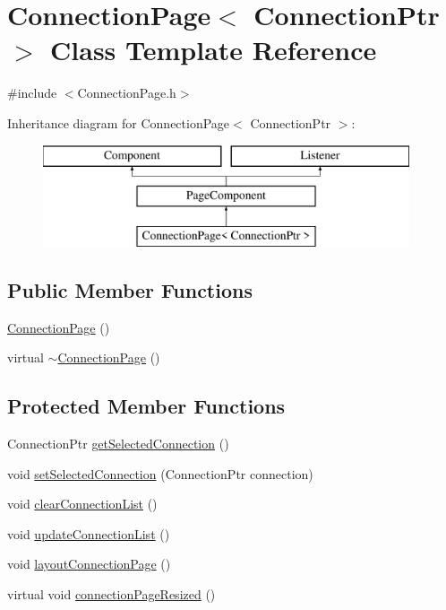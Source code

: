 \hypertarget{classConnectionPage}{}\section{Connection\+Page$<$ Connection\+Ptr $>$ Class Template Reference}
\label{classConnectionPage}


{\ttfamily \#include $<$Connection\+Page.\+h$>$}

Inheritance diagram for Connection\+Page$<$ Connection\+Ptr $>$\+:\begin{figure}[H]
\begin{center}
\leavevmode
\includegraphics[height=3.000000cm]{classConnectionPage}
\end{center}
\end{figure}
\subsection*{Public Member Functions}
\begin{DoxyCompactItemize}
\item 
\mbox{\hyperlink{classConnectionPage_aa23481432cf05cb07269ec54ea317972}{Connection\+Page}} ()
\item 
virtual \mbox{\hyperlink{classConnectionPage_aac26ceb81eee9366599d251d375bbbbf}{$\sim$\+Connection\+Page}} ()
\end{DoxyCompactItemize}
\subsection*{Protected Member Functions}
\begin{DoxyCompactItemize}
\item 
Connection\+Ptr \mbox{\hyperlink{classConnectionPage_a2ca9921ccbb7a4306fa4d77ebf5a0759}{get\+Selected\+Connection}} ()
\item 
void \mbox{\hyperlink{classConnectionPage_a672ee3a78cd42ba94b7e687691dfaffe}{set\+Selected\+Connection}} (Connection\+Ptr connection)
\item 
void \mbox{\hyperlink{classConnectionPage_a1442489fbf0e3332d08d588a246445e6}{clear\+Connection\+List}} ()
\item 
void \mbox{\hyperlink{classConnectionPage_af228c013cf5fea9d4bb85892f92e8016}{update\+Connection\+List}} ()
\item 
void \mbox{\hyperlink{classConnectionPage_ac9b9f324a3487d4c361c2c0a165a8952}{layout\+Connection\+Page}} ()
\item 
virtual void \mbox{\hyperlink{classConnectionPage_a12e25d7627e450f9fe03ed557cb01d44}{connection\+Page\+Resized}} ()
\end{DoxyCompactItemize}
